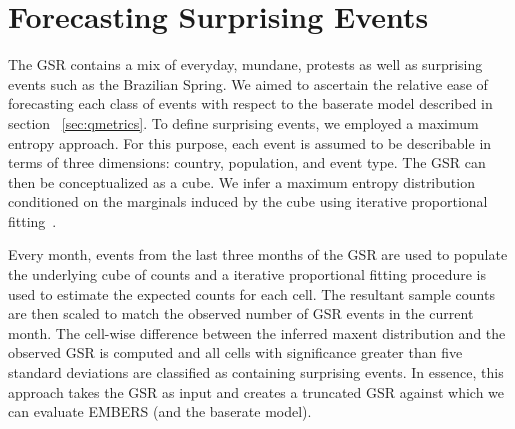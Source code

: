 \section{Forecasting Surprising Events}
\label{sec:suprising}
The GSR contains a mix of everyday, mundane, protests as well as surprising events such as the Brazilian Spring.
We aimed to ascertain the relative ease of forecasting each class of events
with respect to the baserate model described in section
~\ref{sec:qmetrics}.
To define surprising events,
we employed a maximum entropy approach. For this purpose, each event is assumed
to be describable
in terms of three dimensions: country, population, and event type. The GSR can then be conceptualized
as a cube. We infer a maximum entropy distribution conditioned on the marginals
induced by the cube using iterative proportional fitting~\cite{bishop2007discrete}.

%
%

Every month, events from the last three months of the
GSR are used to populate the underlying cube of counts and a iterative
proportional fitting procedure is %
used to estimate the expected counts
for each cell. The resultant sample counts are then scaled to
match the observed number of GSR events in the current month. The cell-wise difference between the inferred
maxent distribution and the observed GSR is computed and all cells with significance greater than five standard
deviations are classified as containing surprising events. In essence, this approach takes the GSR as input and
creates a truncated GSR against which we can evaluate EMBERS (and the baserate model).

